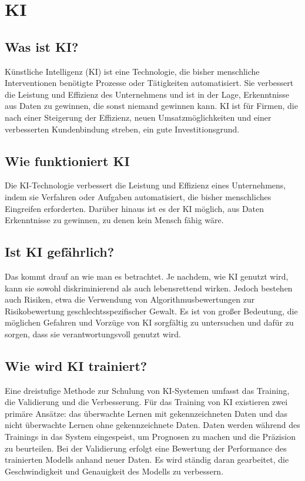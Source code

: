 \section{KI}

\subsection{Was ist KI?}
Künstliche Intelligenz (KI) ist eine Technologie, die bisher menschliche 
Interventionen benötigte Prozesse oder Tätigkeiten automatisiert. 
Sie verbessert die Leistung und Effizienz des Unternehmens und ist in der Lage, 
Erkenntnisse aus Daten zu gewinnen, die sonst niemand gewinnen kann.
KI ist für Firmen, die nach einer Steigerung der Effizienz, 
neuen Umsatzmöglichkeiten und einer verbesserten Kundenbindung streben,
ein gute Investitionsgrund.

\subsection{Wie funktioniert KI}
Die KI-Technologie verbessert die Leistung und Effizienz eines Unternehmens,
indem sie Verfahren oder Aufgaben automatisiert, die bisher menschliches Eingreifen
erforderten. Darüber hinaus ist es der KI möglich, aus Daten Erkenntnisse zu gewinnen,
zu denen kein Mensch fähig wäre.


\subsection{Ist KI gefährlich?}
Das kommt drauf an wie man es betrachtet. Je nachdem, wie KI genutzt wird,
kann sie sowohl diskriminierend als auch lebensrettend wirken. 
Jedoch bestehen auch Risiken, etwa die Verwendung von Algorithmusbewertungen 
zur Risikobewertung geschlechtsspezifischer Gewalt. Es ist von großer 
Bedeutung, die möglichen Gefahren und Vorzüge von KI sorgfältig zu untersuchen 
und dafür zu sorgen, dass sie verantwortungsvoll genutzt wird.

\subsection{Wie wird KI trainiert?}
Eine dreistufige Methode zur Schulung von KI-Systemen umfasst das Training,
die Validierung und die Verbesserung. Für das Training von KI existieren zwei
primäre Ansätze: das überwachte Lernen mit gekennzeichneten Daten und das nicht 
überwachte Lernen ohne gekennzeichnete Daten. Daten werden während des Trainings 
in das System eingespeist, um Prognosen zu machen und die Präzision zu beurteilen. 
Bei der Validierung erfolgt eine Bewertung der Performance des trainierten Modells 
anhand neuer Daten. Es wird ständig daran gearbeitet, die Geschwindigkeit und Genauigkeit 
des Modells zu verbessern.